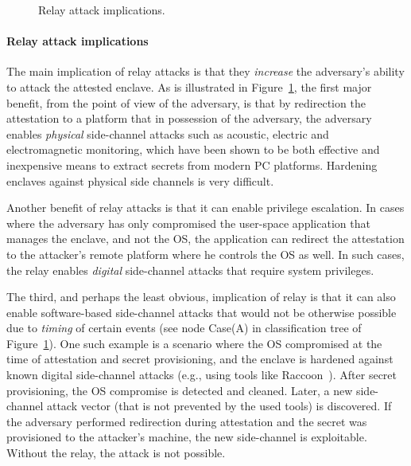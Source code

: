 \begin{figure}[t]
    
    \caption{Relay attack implications.}
    \label{fig:relayTree}
\end{figure}            

\paragraph{Relay attack implications}
The main implication of relay attacks is that they \emph{increase} the adversary's ability to attack the attested enclave. As is illustrated in Figure~\ref{fig:relayTree}, the first major benefit, from the point of view of the adversary, is that by redirection the attestation to a platform that in possession of the adversary, the adversary enables \emph{physical} side-channel attacks such as acoustic, electric and electromagnetic monitoring, which have been shown to be both effective and inexpensive means to extract secrets from modern PC platforms. Hardening enclaves against physical side channels is very difficult. 

Another benefit of relay attacks is that it can enable privilege escalation. In cases where the adversary has only compromised the user-space application that manages the enclave, and not the OS, the application can redirect the attestation to the attacker's remote platform where he controls the OS as well. In such cases, the relay enables \emph{digital} side-channel attacks that require system privileges.

The third, and perhaps the least obvious, implication of relay is that it can also enable software-based side-channel attacks that would not be otherwise possible due to \emph{timing} of certain events (see node Case(A) in classification tree of Figure~\ref{fig:relayTree}). One such example is a scenario where the OS compromised at the time of attestation and secret provisioning, and the enclave is hardened against known digital side-channel attacks (e.g., using tools like Raccoon~\cite{raccoon}). After secret provisioning, the OS compromise is detected and cleaned. Later, a new side-channel attack vector (that is not prevented by the used tools) is discovered. If the adversary performed redirection during attestation and the secret was provisioned to the attacker's machine, the new side-channel is exploitable. Without the relay, the attack is not possible.


